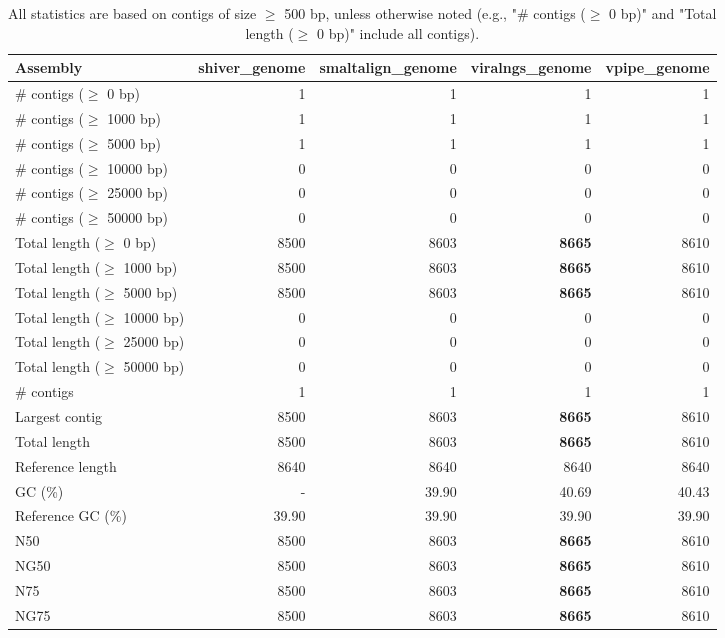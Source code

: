\documentclass[12pt,a4paper]{article}
\begin{document}
\begin{table}[ht]
\begin{center}
\caption{All statistics are based on contigs of size $\geq$ 500 bp, unless otherwise noted (e.g., "\# contigs ($\geq$ 0 bp)" and "Total length ($\geq$ 0 bp)" include all contigs).}
\begin{tabular}{|l*{4}{|r}|}
\hline
Assembly & shiver\_genome & smaltalign\_genome & viralngs\_genome & vpipe\_genome \\ \hline
\# contigs ($\geq$ 0 bp) & 1 & 1 & 1 & 1 \\ \hline
\# contigs ($\geq$ 1000 bp) & 1 & 1 & 1 & 1 \\ \hline
\# contigs ($\geq$ 5000 bp) & 1 & 1 & 1 & 1 \\ \hline
\# contigs ($\geq$ 10000 bp) & 0 & 0 & 0 & 0 \\ \hline
\# contigs ($\geq$ 25000 bp) & 0 & 0 & 0 & 0 \\ \hline
\# contigs ($\geq$ 50000 bp) & 0 & 0 & 0 & 0 \\ \hline
Total length ($\geq$ 0 bp) & 8500 & 8603 & {\bf 8665} & 8610 \\ \hline
Total length ($\geq$ 1000 bp) & 8500 & 8603 & {\bf 8665} & 8610 \\ \hline
Total length ($\geq$ 5000 bp) & 8500 & 8603 & {\bf 8665} & 8610 \\ \hline
Total length ($\geq$ 10000 bp) & 0 & 0 & 0 & 0 \\ \hline
Total length ($\geq$ 25000 bp) & 0 & 0 & 0 & 0 \\ \hline
Total length ($\geq$ 50000 bp) & 0 & 0 & 0 & 0 \\ \hline
\# contigs & 1 & 1 & 1 & 1 \\ \hline
Largest contig & 8500 & 8603 & {\bf 8665} & 8610 \\ \hline
Total length & 8500 & 8603 & {\bf 8665} & 8610 \\ \hline
Reference length & 8640 & 8640 & 8640 & 8640 \\ \hline
GC (\%) & - & 39.90 & 40.69 & 40.43 \\ \hline
Reference GC (\%) & 39.90 & 39.90 & 39.90 & 39.90 \\ \hline
N50 & 8500 & 8603 & {\bf 8665} & 8610 \\ \hline
NG50 & 8500 & 8603 & {\bf 8665} & 8610 \\ \hline
N75 & 8500 & 8603 & {\bf 8665} & 8610 \\ \hline
NG75 & 8500 & 8603 & {\bf 8665} & 8610 \\ \hline

\end{tabular}
\end{center}
\end{table}
\end{document}
